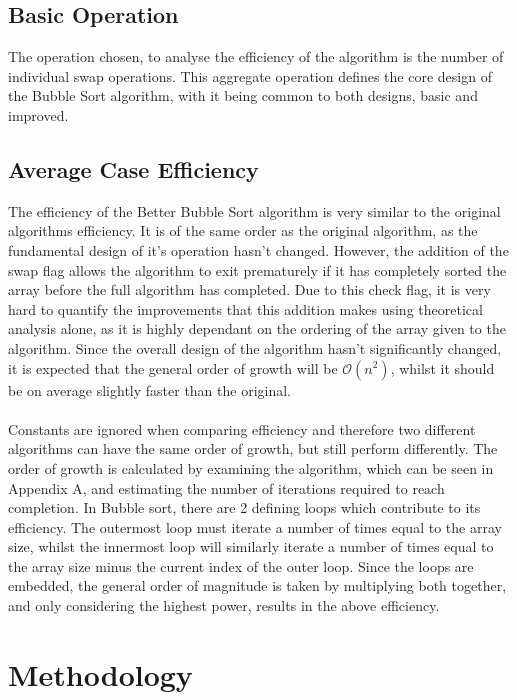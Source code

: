 \documentclass[]{article}
\begin{document}
\subsection{Basic Operation}
The operation chosen, to analyse the efficiency of the algorithm is the number of individual swap operations. This aggregate operation defines the core design of the Bubble Sort algorithm, with it being common to both designs, basic and improved.

\subsection{Average Case Efficiency}
The efficiency of the Better Bubble Sort algorithm is very similar to the original algorithms efficiency. It is of the same order as the original algorithm, as the fundamental design of it's operation hasn't changed. However, the addition of the swap flag allows the algorithm to exit prematurely if it has completely sorted the array before the full algorithm has completed. Due to this check flag, it is very hard to quantify the improvements that this addition makes using theoretical analysis alone, as it is highly dependant on the ordering of the array given to the algorithm. Since the overall design of the algorithm hasn't significantly changed, it is expected that the general order of growth will be $\mathcal{O}(n^2)$, whilst it should be on average slightly faster than the original. 
\\\\
Constants are ignored when comparing efficiency and therefore two different algorithms can have the same order of growth, but still perform differently. The order of growth is calculated by examining the algorithm, which can be seen in Appendix A, and estimating the number of iterations required to reach completion. In Bubble sort, there are 2 defining loops which contribute to its efficiency. The outermost loop must iterate a number of times equal to the array size, whilst the innermost loop will similarly iterate a number of times equal to the array size minus the current index of the outer loop. Since the loops are embedded, the general order of magnitude is taken by multiplying both together, and only considering the highest power, results in the above efficiency. 
\section{Methodology}
\end{document}
